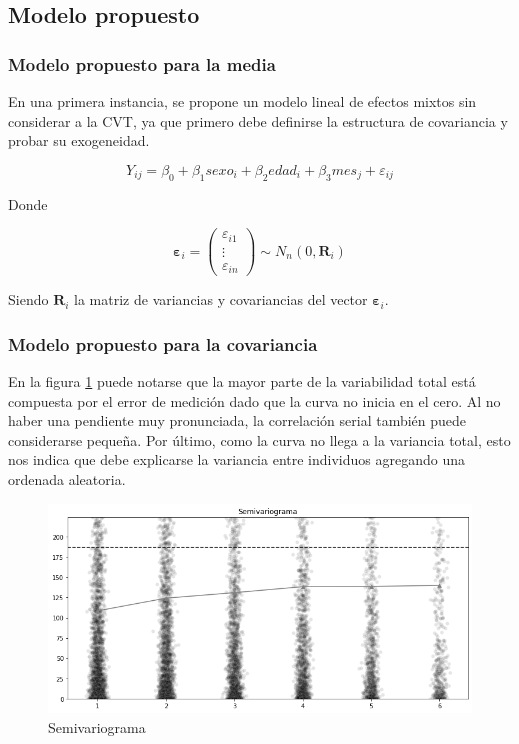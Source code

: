 \documentclass[spanish]{article}
\numberwithin{figure}{subsection}
\numberwithin{equation}{subsection}
\numberwithin{table}{subsection}
\begin{document}
\subsection{Modelo propuesto}

\subsubsection{Modelo propuesto para la media}

En una primera instancia, se propone un modelo lineal de efectos mixtos sin
considerar a la CVT, ya que primero debe definirse la estructura de covariancia
y probar su exogeneidad.

\[
	Y_{ij} = \beta_0 + \beta_1 sexo_i + \beta_2 edad_i +
	\beta_3 mes_j + \varepsilon_{ij}
\]

Donde 

\[
	\bm{\varepsilon}_i = \begin{pmatrix} \varepsilon_{i1} \\ \vdots \\ \varepsilon_{in} \end{pmatrix} \sim N_{n}(0, \bm{R}_i)
\]


Siendo $\bm{R}_i$ la matriz de variancias y covariancias del vector $\bm{\varepsilon}_i$.

\subsubsection{Modelo propuesto para la covariancia}

En la figura \ref{semivariogram} puede notarse que la mayor parte de la
variabilidad total está compuesta por el error de medición dado que la curva no
inicia en el cero. Al no haber una pendiente muy pronunciada, la correlación
serial también puede considerarse pequeña. Por último, como la curva no llega a
la variancia total, esto nos indica que debe explicarse la variancia entre
individuos agregando una ordenada aleatoria.


\begin{figure}[H]
	\centering
	\includegraphics[scale=0.4]{img/semivariogram.png}
	\caption{Semivariograma}
	\label{semivariogram}
\end{figure}
\end{document}
